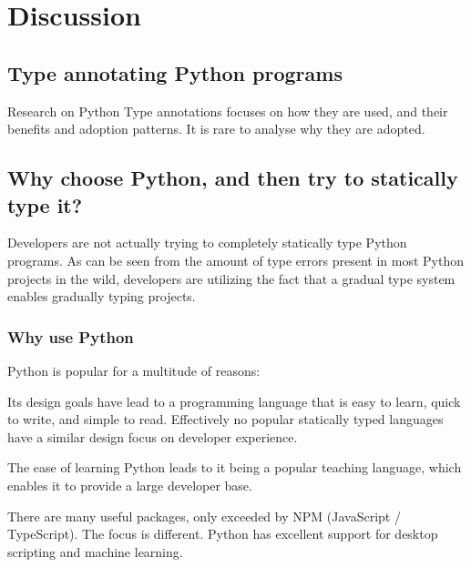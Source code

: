 \chapter{Discussion\label{discussion}}


\section{Type annotating Python programs} 

Research on Python Type annotations focuses on how they are used, and their benefits and adoption patterns. It is rare to analyse why they are adopted.


\section{Why choose Python, and then try to statically type it?}

Developers are not actually trying to completely statically type Python programs. As can be seen from the amount of type errors present in most Python projects in the wild\cite{rak-amnouykit_taleoftwo_2020, di_grazia_evolution_2022}, developers are utilizing the fact that a gradual type system enables gradually typing projects.

\subsection{Why use Python}
Python is popular for a multitude of reasons:

Its design goals have lead to a programming language that is easy to learn, quick to write, and simple to read. Effectively no popular statically typed languages have a similar design focus on developer experience.

The ease of learning Python leads to it being a popular teaching language, which enables it to provide a large developer base.

There are many useful packages, only exceeded by NPM (JavaScript / TypeScript). The focus is different. Python has excellent support for desktop scripting and machine learning.


